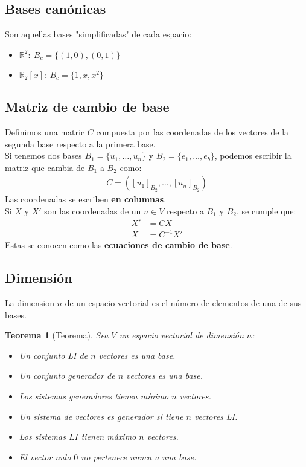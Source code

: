 \documentclass{article}
\newtheorem*{propiedades_bases}{Teorema}
\begin{document}
\subsection{Bases canónicas}
Son aquellas bases "simplificadas" de cada espacio:
\begin{itemize}
    \item $\mathbb{R}^{2}:\: B_{c} = \{ (1,0), (0,1) \}$
    \item $\mathbb{R}_{2}[x]:\: B_{c} = \{ 1,x,x^{2} \}$
\end{itemize}
\subsection{Matriz de cambio de base}
Definimos una matric $C$ compuesta por las coordenadas de los vectores de la segunda base respecto a la primera base.\\
Si tenemos dos bases $B_{1} = \{ u_{1},\dots,u_{n} \}$ y $B_{2}=\{ e_{1},\dots,e_{b} \}$,
podemos escribir la matriz que cambia de $B_{1}$ a $B_{2}$ como:
\begin{equation}
    \begin{split}
        C = ([u_{1}]_{B_{2}},\dots, [u_{n}]_{B_{2}})
    \end{split}
\end{equation}
Las coordenadas se escriben \textbf{en columnas}.\\
Si $X$ y $X'$ son las coordenadas de un $u \in V$ respecto a $B_{1}$ y $B_{2}$, se cumple que:
\begin{equation}
    \begin{split}
        X' &= CX\\
        X &= C^{-1}X'
    \end{split}
\end{equation}
Estas se conocen como las \textbf{ecuaciones de cambio de base}.
\subsection{Dimensión}
La dimension $n$ de un espacio vectorial es el número de elementos de una de sus bases.
\begin{propiedades_bases}[Teorema]
    Sea $V$ un espacio vectorial de dimensión $n$:
    \begin{itemize}
        \item Un conjunto LI de $n$ vectores es una base.
        \item Un conjunto generador de $n$ vectores es una base.
        \item Los sistemas generadores tienen mínimo $n$ vectores.
        \item Un sistema de vectores es generador si tiene $n$ vectores LI.
        \item Los sistemas $LI$ tienen máximo $n$ vectores.
        \item El vector nulo $\bar{0}$ no pertenece nunca a una base.
    \end{itemize}
    
\end{propiedades_bases}
\end{document}
